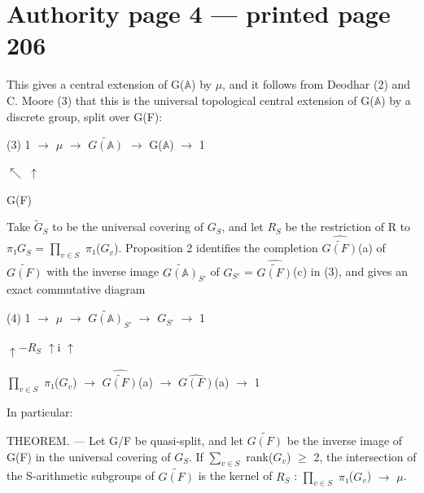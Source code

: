 \documentclass[10pt,a4paper]{article}
\begin{document}
\section*{Authority page 4 --- printed page 206}
\noindent This gives a central extension of G(\ensuremath{𝔸}) by \ensuremath{μ}, and it follows from Deodhar (2) and C. Moore (3) that this is the universal topological central extension of G(\ensuremath{𝔸}) by a discrete group, split over G(F):\par
\smallskip
\noindent (3)    1 \ensuremath{→} \ensuremath{μ} \ensuremath{→} \ensuremath{\widetilde{G(𝔸)}} \ensuremath{→} G(\ensuremath{𝔸}) \ensuremath{→} 1\par
\noindent                          \ensuremath{↖}          \ensuremath{↑}\par
\noindent                               G(F)\par
\smallskip
\noindent Take \ensuremath{\widetilde{G}_S} to be the universal covering of \ensuremath{G_S}, and let \ensuremath{R_S} be the restriction of R to \ensuremath{π₁}\ensuremath{G_S} = \ensuremath{∏_{v∈S}} \ensuremath{π₁}(\ensuremath{G_v}). Proposition 2 identifies the completion \ensuremath{\widehat{\widetilde{G(F)}}}(a) of \ensuremath{\widetilde{G(F)}} with the inverse image \ensuremath{\widetilde{G(𝔸)}_{S′}} of \ensuremath{G_{S′}} = \ensuremath{\widehat{\widetilde{G(F)}}}(c) in (3), and gives an exact commutative diagram\par
\smallskip
\noindent (4)    1 \ensuremath{→} \ensuremath{μ} \ensuremath{→} \ensuremath{\widetilde{G(𝔸)}_{S′}} \ensuremath{→} \ensuremath{G_{S′}} \ensuremath{→} 1\par
\noindent              \ensuremath{↑−}\ensuremath{R_S}          \ensuremath{↑}i             \ensuremath{↑}\par
\noindent        \ensuremath{∏_{v∈S}} \ensuremath{π₁}(\ensuremath{G_v}) \ensuremath{→} \ensuremath{\widehat{\widetilde{G(F)}}}(a) \ensuremath{→} \ensuremath{\widehat{G(F)}}(a) \ensuremath{→} 1\par
\smallskip
\noindent In particular:\par
\smallskip
\noindent THEOREM. — Let G/F be quasi-split, and let \ensuremath{\widetilde{G(F)}} be the inverse image of G(F) in the universal covering of \ensuremath{G_S}. If \ensuremath{∑_{v∈S}} rank(\ensuremath{G_v}) \ensuremath{≥} 2, the intersection of the S-arithmetic subgroups of \ensuremath{\widetilde{G(F)}} is the kernel of \ensuremath{R_S} : \ensuremath{∏_{v∈S}} \ensuremath{π₁}(\ensuremath{G_v}) \ensuremath{→} \ensuremath{μ}.\par
\end{document}
